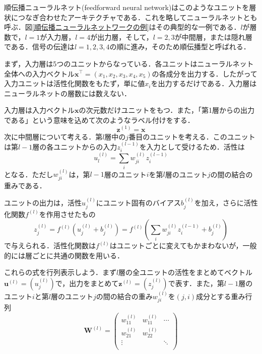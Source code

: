 \documentclass[a4paper,11pt]{jsreport}
\begin{document}
順伝播ニューラルネット(feedforward neural network)はこのようなユニットを層状につなぎ合わせたアーキテクチャである．これを略してニューラルネットとも呼ぶ．図\ref{順伝播ニューラルネットワークの例}はその典型的な一例である．$l$が層数で，$l=1$が入力層，$l=4$が出力層，そして，$l=2,3$が中間層，または隠れ層である．信号の伝達は$l=1,2,3,4$の順に進み，そのため順伝播型と呼ばれる．\par
まず，入力層は5つのユニットからなっている．各ユニットはニューラルネット全体への入力ベクトル$\bm{x}^{\top}=(x_1, x_2, x_3, x_4, x_5)$の各成分を出力する．したがって入力ユニットは活性化関数をもたず，単に値$x_i$を出力するだけである．入力層はニューラルネットの層数には数えない．\par
入力層は入力ベクトル$\bm{x}$の次元数だけユニットをもつ．また，「第1層からの出力である」という意味を込めて次のようなラベル付けをする．
\begin{equation}
  \bm{z}^{(1)} = \bm{x}
\end{equation}
次に中間層について考える．第$l$層中の$j$番目のユニットを考える．このユニットは第$l-1$層の各ユニットからの入力$z_i^{(l-1)}$を入力として受けるため．活性は
\begin{equation}
  u_l^{(l)} = \sum_i w_{ji}^{(l)} z_i^{(l-1)}
\end{equation}
となる．ただし$w_{ji}^{(l)}$は，第$l-1$層のユニット$i$を第$l$層のユニット$j$の間の結合の重みである．\par
ユニットの出力は，活性$u_j^{(l)}$にユニット固有のバイアス$b_j^{(l)}$を加え，さらに活性化関数$f^{(l)}$を作用させたもの
\begin{equation}
  z_j^{(l)}
  = f^{(l)} \left( u_j^{(l)} + b_j^{(l)} \right)
  = f^{(l)} \left( \sum_i w_{ji}^{(l)} z_i^{(l-1)} + b_j^{(l)} \right)
\end{equation}
で与えられる．活性化関数は$f^{(l)}$はユニットごとに変えてもかまわないが，一般的には層ごとに共通の関数を用いる．\par
これらの式を行列表示しよう．まず$l$層の全ユニットの活性をまとめてベクトル$\bm{u}^{(l)}=\left( u_j^{(l)} \right)$で，出力をまとめて$\bm{z}^{(l)}=\left( z_j^{(l)} \right)$で表す．また，第$l-1$層のユニット$i$と第$l$層のユニット$j$の間の結合の重み$w_{ji}^{(l)}$を$(j,i)$成分とする重み行列
\begin{equation}
  \bm{W}^{(l)}
  =\begin{pmatrix}
    w_{11}^{(l)} & w_{11}^{(l)} & \cdots \\
    w_{21}^{(l)} & w_{22}^{(l)} &        \\
    \vdots       &              & \ddots \\
  \end{pmatrix}
\end{equation}
\end{document}
